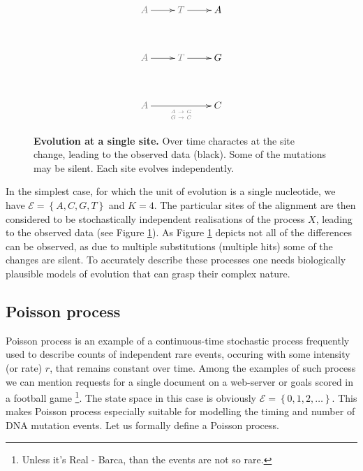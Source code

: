 \documentclass[12pt,twoside]{mitthesis}
\theoremstyle{plain}
\theoremstyle{definition}
\theoremstyle{remark}
\begin{document}
\begin{figure}[H]
\begin{center}
\begingroup
\everymath{\displaystyle}
{\Large
\begin{displaymath} %
    \xymatrix@R+1pc{ 
\color{gray2}A \ar[r] & \color{gray2}T \ar[r] & A \\
\color{gray2}A \ar[r] & \color{gray2}T \ar[r] & G \\
\color{gray2}A  \ar[rr]_{\tiny \color{gray2}\begin{array}{c}
A\rightarrow G\\
G\rightarrow C
\end{array}} &&  C
    } %
\end{displaymath}
}%
\endgroup
\end{center}
\caption{{ \footnotesize {\bf Evolution at a single site.} Over time charactes at the site change, leading to the observed data (black). Some of the mutations may be silent. Each site evolves independently.
}}
\label{fig:alignment}
\end{figure}

In the simplest case, for which the unit of evolution is a single nucleotide, we have $\mathcal{E}=\left\{ A,C,G,T\right\}$ and $K=4$.
The particular sites of the alignment are then considered to be stochastically independent realisations of the process $X$, leading to the observed data (see Figure \ref{fig:alignment}). 
As Figure \ref{fig:alignment} depicts not all of the differences can be observed, as due to multiple substitutions (multiple hits) some of the changes are silent.
To accurately describe these processes one needs biologically plausible models of evolution that can grasp their complex nature. 

\subsection{Poisson process}

Poisson process is an example of a continuous-time stochastic process frequently used to describe counts of independent rare events, occuring with some intensity (or rate) $r$, that remains constant over time. 
Among the examples of such process we can mention requests for a single document on a web-server or goals scored in a football game \footnote{Unless it's Real - Barca, than the events are not so rare.}.
The state space in this case is obviously $\mathcal{E} = \left\{ 0,1,2, \dots \right\}$.
This makes Poisson process especially suitable for modelling the timing and number of DNA mutation events. 
Let us formally define a Poisson process.
\end{document}
